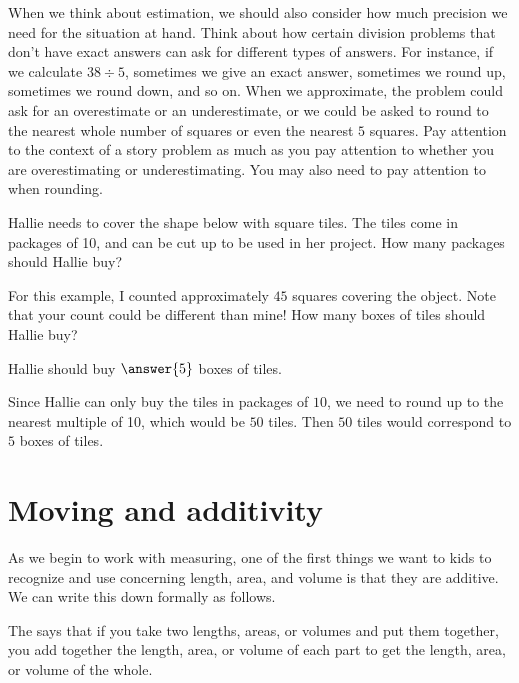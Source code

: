 \documentclass{ximera}
\begin{document}
When we think about estimation, we should also consider how much precision we need for the situation at hand. Think about how certain division problems that don't have exact answers can ask for different types of answers. For instance, if we calculate $38 \div 5$, sometimes we give an exact answer, sometimes we round up, sometimes we round down, and so on. When we approximate, the problem could ask for an overestimate or an underestimate, or we could be asked to round to the nearest whole number of squares or even the nearest $5$ squares. Pay attention to the context of a story problem as much as you pay attention to whether you are overestimating or underestimating. You may also need to pay attention to  when rounding.

\begin{question}
Hallie needs to cover the shape below with square tiles. The tiles come in packages of 10, and can be cut up to be used in her project. How many packages should Hallie buy?
\begin{image}
\end{image}
For this example, I counted approximately $45$ squares covering the object. Note that your count could be different than mine!
How many boxes of tiles should Hallie buy?
\begin{prompt}
Hallie should buy $\answer{5}$ boxes of tiles.
\begin{feedback}[correct]
Since Hallie can only buy the tiles in packages of $10$, we need to round up to the nearest multiple of 10, which would be $50$ tiles. Then $50$ tiles would correspond to $5$ boxes of tiles.
\end{feedback}
\end{prompt}

\end{question}



\section{Moving and additivity}

As we begin to work with measuring, one of the first things we want to kids to recognize and use concerning length, area, and volume is that they are additive. We can write this down formally as follows.
\begin{definition}
The  says that if you take two lengths, areas, or volumes and put them together, you add together the length, area, or volume of each part to get the length, area, or volume of the whole.
\end{definition}
\end{document}
